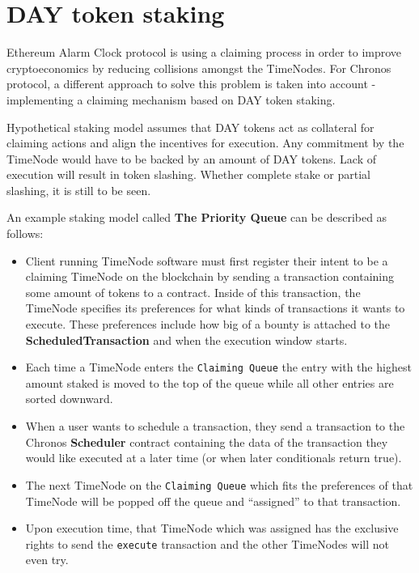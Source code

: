 \documentclass{report}
\begin{document}
  \section{DAY token staking}

  Ethereum Alarm Clock protocol is using a claiming process in order to improve cryptoeconomics by reducing collisions amongst the TimeNodes. For Chronos protocol, a different approach to solve this problem is taken into account - implementing a claiming mechanism based on DAY token staking.

  Hypothetical staking model assumes that DAY tokens act as collateral for claiming actions and align the incentives for execution. Any commitment by the TimeNode would have to be backed by an amount of DAY tokens. Lack of execution will result in token slashing. Whether complete stake or partial slashing, it is still to be seen.

  An example staking model called \textbf{The Priority Queue} can be described as follows:

  \begin{itemize}
    \item Client running TimeNode software must first register their intent to be a claiming TimeNode on the blockchain by sending a transaction containing some amount of tokens to a contract. Inside of this transaction, the TimeNode specifies its preferences for what kinds of transactions it wants to execute. These preferences include how big of a bounty is attached to the \textbf{ScheduledTransaction} and when the execution window starts.
    \item Each time a TimeNode enters the \texttt{Claiming Queue} the entry with the highest amount staked is moved to the top of the queue while all other entries are sorted downward.
    \item When a user wants to schedule a transaction, they send a transaction to the Chronos \textbf{Scheduler} contract containing the data of the transaction they would like executed at a later time (or when later conditionals return true).
    \item The next TimeNode on the \texttt{Claiming Queue} which fits the preferences of that TimeNode will be popped off the queue and “assigned” to that transaction.
    \item Upon execution time, that TimeNode which was assigned has the exclusive rights to send the \texttt{execute} transaction and the other TimeNodes will not even try.
  \end{itemize}
\end{document}
